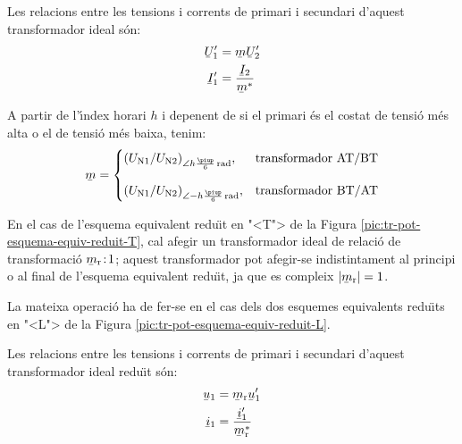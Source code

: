 \begin{center}
    
\end{center}

Les relacions entre les tensions i corrents de primari i secundari d'aquest transformador ideal s\'{o}n:
\begin{subequations}
\begin{align}
    \cmplx{U}'_1 &= \cmplx{m}\cmplx{U}'_2\\  \cmplx{I}'_1 &= \frac{\cmplx{I}_2}{\cmplx{m}^*}
\end{align}
\end{subequations}

A partir de l'\'{\i}ndex horari $h$ i depenent de si el primari \'{e}s el costat de tensi\'{o} m\'{e}s alta o el de tensi\'{o} m\'{e}s baixa, tenim:
\begin{equation}
\cmplx{m} = \begin{cases}
     (U\ped{N1}/U\ped{N2})_{\angle h \frac{\piup}{6}\unit{rad}}, & \text{transformador AT/BT}\\[2.7ex]
     (U\ped{N1}/U\ped{N2})_{\angle -h \frac{\piup}{6}\unit{rad}}, & \text{transformador BT/AT}
\end{cases}
\label{eq:rel-transf-cmplx}
\end{equation}

En el cas de l'esquema equivalent redu\"{\i}t en {"<}T{">} de la Figura \vref{pic:tr-pot-esquema-equiv-reduit-T}, cal afegir un transformador ideal de relaci\'{o} de transformaci\'{o}  $\cmplx{m}\ped{r}\!:\!1$; aquest transformador pot afegir-se indistintament  al principi o al final de l'esquema equivalent redu\"{\i}t, ja que es compleix $|\cmplx{m}\ped{r}|=1$.

\begin{center}
    
    \label{fig:esq-reduit-T-complex}
\end{center}

La mateixa operaci\'{o} ha de fer-se en el cas dels dos esquemes equivalents redu\"{\i}ts en {"<}L{">} de la Figura \vref{pic:tr-pot-esquema-equiv-reduit-L}.

Les relacions entre les tensions i corrents de primari i secundari d'aquest transformador ideal redu\"{\i}t s\'{o}n:
\begin{subequations}
\begin{align}
    \cmplx{u}_1 &= \cmplx{m}\ped{r}\cmplx{u}'_1\\  \cmplx{i}_1 &= \frac{\cmplx{i}'_1}{\cmplx{m}^*\ped{r}}
\end{align}
\end{subequations}


